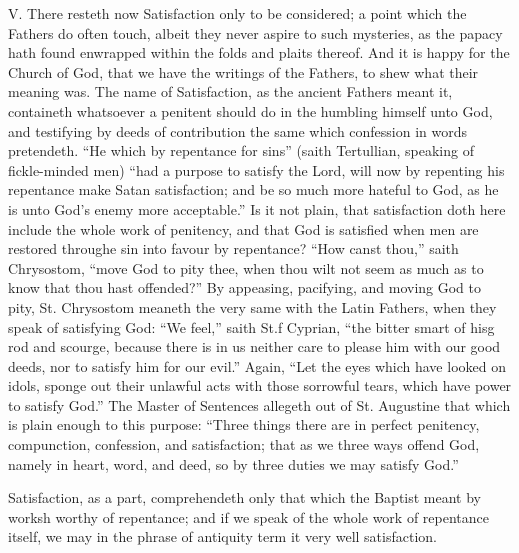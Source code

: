 V. There resteth now Satisfaction only to be considered; a point which the Fathers do often touch, albeit they never aspire to such mysteries, as the papacy hath found enwrapped within the folds and plaits thereof. And it is happy for the Church of God, that we have the writings of the Fathers, to shew what their meaning was. The name of Satisfaction, as the ancient Fathers meant it, containeth whatsoever a penitent should do in the humbling himself unto God, and testifying by deeds of contribution the same which confession in words pretendeth. “He which by repentance for sins” (saith Tertullian, speaking of fickle-minded men) “had a purpose to satisfy the Lord, will now by repenting his repentance make Satan satisfaction; and be so much more hateful to God, as he is unto God’s enemy more acceptable.” Is it not plain, that satisfaction doth here include the whole work of penitency, and that God is satisfied when men are restored throughe sin into favour by repentance? “How canst thou,” saith Chrysostom, “move God to pity thee, when thou wilt not seem as much as to know that thou hast offended?” By appeasing, pacifying, and moving God to pity, St. Chrysostom meaneth the very same with the Latin Fathers, when they speak of satisfying God: “We feel,” saith St.f Cyprian,  “the bitter smart of hisg rod and scourge, because there is in us neither care to please him with our good deeds, nor to satisfy him for our evil.” Again, “Let the eyes which have looked on idols, sponge out their unlawful acts with those sorrowful tears, which have power to satisfy God.” The Master of Sentences allegeth out of St. Augustine that which is plain enough to this purpose: “Three things there are in perfect penitency, compunction, confession, and satisfaction; that as we three ways offend God, namely in heart, word, and deed, so by three duties we may satisfy God.”

Satisfaction, as a part, comprehendeth only that which the Baptist meant by worksh worthy of repentance; and if we speak of the whole work of repentance itself, we may in the phrase of antiquity term it very well satisfaction.

